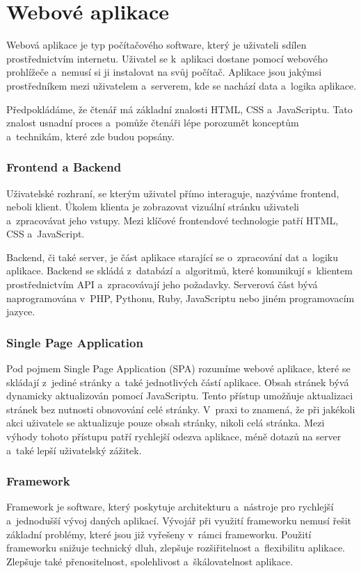 \section{Webové aplikace}

Webová aplikace je typ počítačového software, který je uživateli sdílen prostřednictvím internetu. 
Uživatel se k~aplikaci dostane pomocí webového prohlížeče a~nemusí si ji instalovat na svůj počítač. 
Aplikace jsou jakýmsi prostředníkem mezi uživatelem a~serverem, kde se nachází data a~logika aplikace.\cite{codeacademywebapp}

Předpokládáme, že čtenář má základní znalosti HTML, CSS a~JavaScriptu. 
Tato znalost usnadní proces a~pomůže čtenáři lépe porozumět konceptům a~technikám, které zde budou popsány.

\subsubsection*{Frontend a Backend}

Uživatelské rozhraní, se kterým uživatel přímo interaguje, nazýváme frontend, neboli klient.
Úkolem klienta je zobrazovat vizuální stránku uživateli a~zpracovávat jeho vstupy. 
Mezi klíčové frontendové technologie patří HTML, CSS a~JavaScript.

Backend, či také server, je část aplikace starající se o~zpracování dat a~logiku aplikace. 
Backend se skládá z~databází a~algoritmů, které komunikují s~klientem prostřednictvím API a~zpracovávají jeho požadavky. 
Serverová část bývá naprogramována v~PHP, Pythonu, Ruby, JavaScriptu nebo jiném programovacím jazyce.\cite{stateofartframeworks}

\subsubsection*{Single Page Application}

Pod pojmem Single Page Application (SPA) rozumíme webové aplikace, které se skládají z~jediné stránky a~také jednotlivých částí aplikace. 
Obsah stránek bývá dynamicky aktualizován pomocí JavaScriptu. Tento přístup umožňuje aktualizaci stránek bez nutnosti obnovování celé stránky. 
V~praxi to znamená, že při jakékoli akci uživatele se aktualizuje pouze obsah stránky, nikoli celá stránka. 
Mezi výhody tohoto přístupu patří rychlejší odezva aplikace, méně dotazů na server a~také lepší uživatelský zážitek.\cite{jadhavspa}

\subsubsection*{Framework}

Framework je software, který poskytuje architekturu a~nástroje pro rychlejší a~jednodušší vývoj daných aplikací. 
Vývojář při využití frameworku nemusí řešit základní problémy, které jsou již vyřešeny v~rámci frameworku. 
Použití frameworku snižuje technický dluh, zlepšuje rozšiřitelnost a~flexibilitu aplikace. 
Zlepšuje také přenositelnost, spolehlivost a~škálovatelnost aplikace.\cite{schmidtframeworks}